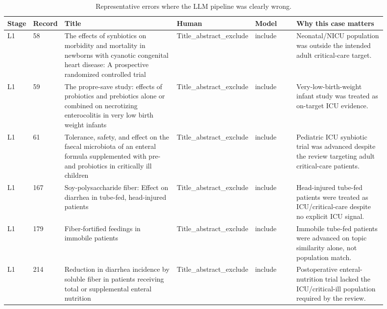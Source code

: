 \begin{table}[ht]
\centering
\caption{Representative errors where the LLM pipeline was clearly wrong.}
\label{tab:fiber-clearly-wrong-errors}
\begin{tabular}{p{0.06\linewidth} p{0.06\linewidth} p{0.30\linewidth} p{0.13\linewidth} p{0.11\linewidth} p{0.24\linewidth}}
\hline
Stage & Record & Title & Human & Model & Why this case matters \\
\hline
L1 & 58 & The effects of synbiotics on morbidity and mortality in newborns with cyanotic congenital heart disease: A prospective randomized controlled trial & Title\_abstract\_exclude & include & Neonatal/NICU population was outside the intended adult critical-care target. \\
L1 & 59 & The propre-save study: effects of probiotics and prebiotics alone or combined on necrotizing enterocolitis in very low birth weight infants & Title\_abstract\_exclude & include & Very-low-birth-weight infant study was treated as on-target ICU evidence. \\
L1 & 61 & Tolerance, safety, and effect on the faecal microbiota of an enteral formula supplemented with pre- and probiotics in critically ill children & Title\_abstract\_exclude & include & Pediatric ICU synbiotic trial was advanced despite the review targeting adult critical-care patients. \\
L1 & 167 & Soy-polysaccharide fiber: Effect on diarrhea in tube-fed, head-injured patients & Title\_abstract\_exclude & include & Head-injured tube-fed patients were treated as ICU/critical-care despite no explicit ICU signal. \\
L1 & 179 & Fiber-fortified feedings in immobile patients & Title\_abstract\_exclude & include & Immobile tube-fed patients were advanced on topic similarity alone, not population match. \\
L1 & 214 & Reduction in diarrhea incidence by soluble fiber in patients receiving total or supplemental enteral nutrition & Title\_abstract\_exclude & include & Postoperative enteral-nutrition trial lacked the ICU/critical-ill population required by the review. \\
\hline
\end{tabular}
\end{table}

